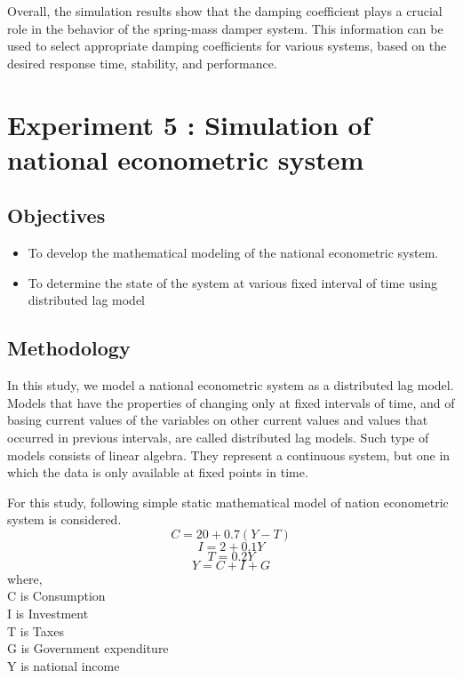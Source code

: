 \documentclass[10pt,journal,cspaper,compsoc]{IEEEtran}
\begin{document}
Overall, the simulation results show that the damping coefficient plays a crucial role in the behavior of the spring-mass damper system. 
This information can be used to select appropriate damping coefficients for various systems, based on the desired response time, stability, and performance.

\section{Experiment 5 : Simulation of national econometric system}
\subsection{Objectives}
\begin{itemize}
  \item To develop the mathematical modeling of the national econometric system.
  \item To determine the state of the system at various fixed interval of time using distributed lag model
\end{itemize}
\subsection{Methodology}
  In this study, we model a national econometric system as a distributed lag model. Models that have the properties of changing only at fixed intervals of time, and of basing current values  of the variables on other current values and values that occurred in previous intervals, are called distributed lag models. Such type of models consists of linear algebra. They represent a continuous system, but one in which the data is only available at fixed
  points in time.

  For this study, following simple static mathematical model of nation econometric system is considered.
  \begin{equation}
    C = 20 + 0.7 (Y-T)
  \end{equation}
  \begin{equation}
    I = 2 + 0.1 Y
  \end{equation}
  \begin{equation}
    T = 0.2 Y
  \end{equation}
  \begin{equation}
    Y = C + I + G
  \end{equation} 
    where,\\
    C is Consumption\\
    I is Investment\\
    T is Taxes\\
    G is Government expenditure\\
    Y is national income\\
    
\end{document}
